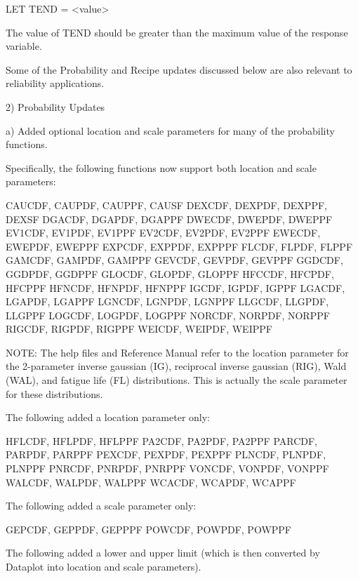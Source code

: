 {           LET TEND = <value>
   
       The value of TEND should be greater than the maximum value
       of the response variable.

    Some of the Probability and Recipe updates discussed below are
    also relevant to reliability applications.

 2) Probability Updates

    a) Added optional location and scale parameters for many of the
       probability functions.

       Specifically, the following functions now support both location
       and scale parameters:
   
          CAUCDF, CAUPDF, CAUPPF, CAUSF
          DEXCDF, DEXPDF, DEXPPF, DEXSF
          DGACDF, DGAPDF, DGAPPF
          DWECDF, DWEPDF, DWEPPF
          EV1CDF, EV1PDF, EV1PPF
          EV2CDF, EV2PDF, EV2PPF
          EWECDF, EWEPDF, EWEPPF
          EXPCDF, EXPPDF, EXPPPF
          FLCDF, FLPDF, FLPPF
          GAMCDF, GAMPDF, GAMPPF
          GEVCDF, GEVPDF, GEVPPF
          GGDCDF, GGDPDF, GGDPPF
          GLOCDF, GLOPDF, GLOPPF
          HFCCDF, HFCPDF, HFCPPF
          HFNCDF, HFNPDF, HFNPPF
          IGCDF, IGPDF, IGPPF
          LGACDF, LGAPDF, LGAPPF
          LGNCDF, LGNPDF, LGNPPF
          LLGCDF, LLGPDF, LLGPPF
          LOGCDF, LOGPDF, LOGPPF
          NORCDF, NORPDF, NORPPF
          RIGCDF, RIGPDF, RIGPPF
          WEICDF, WEIPDF, WEIPPF
   
       NOTE: The help files and Reference Manual refer to the
             location parameter for the 2-parameter inverse gaussian
             (IG), reciprocal inverse gaussian (RIG), Wald (WAL), and
             fatigue life (FL) distributions.  This is actually the
             scale parameter for these distributions.
   
       The following added a location parameter only:
   
          HFLCDF, HFLPDF, HFLPPF
          PA2CDF, PA2PDF, PA2PPF
          PARCDF, PARPDF, PARPPF
          PEXCDF, PEXPDF, PEXPPF
          PLNCDF, PLNPDF, PLNPPF
          PNRCDF, PNRPDF, PNRPPF
          VONCDF, VONPDF, VONPPF
          WALCDF, WALPDF, WALPPF
          WCACDF, WCAPDF, WCAPPF
   
       The following added a scale parameter only:
   
          GEPCDF, GEPPDF, GEPPPF
          POWCDF, POWPDF, POWPPF
   
       The following added a lower and upper limit (which is then
       converted by Dataplot into location and scale parameters).
   
}
